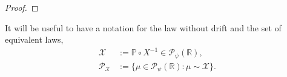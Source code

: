 \documentclass[11pt]{article}
\theoremstyle{definition}
\begin{document}
\begin{proof}

\end{proof}

It will be useful to have a notation for the law without drift and the set of equivalent laws,
\begin{align*}
    \mathcal{X} &:= \mathbb{P} \circ X^{-1} \in \mathcal{P}_{\psi}(\mathbb{R}), \\
    \mathcal{P}_\mathcal{X} &:= \{ \mu \in \mathcal{P}_{\psi}(\mathbb{R}) : \mu \sim \mathcal{X} \}.
\end{align*}
\end{document}
